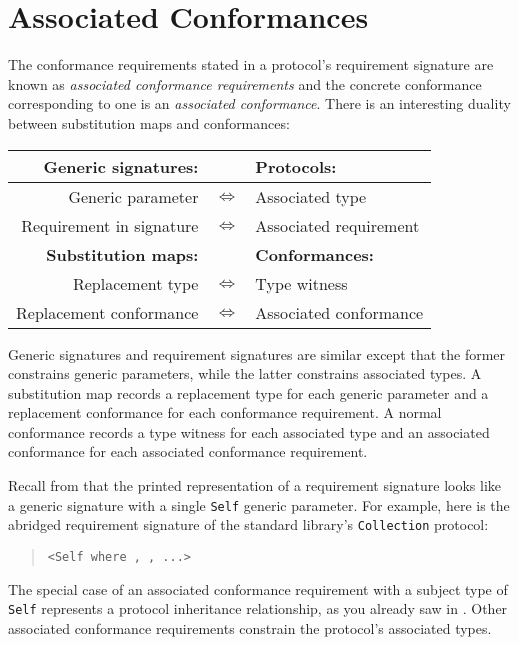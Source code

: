 \documentclass[../generics]{subfiles}
\begin{document}
\section{Associated Conformances}\label{associated conformances}
The conformance requirements stated in a protocol's requirement signature are known as \emph{associated conformance requirements} and the concrete conformance corresponding to one is an \emph{associated conformance}. There is an interesting duality between substitution maps and conformances:
\begin{center}
\begin{tabular}{rcl}
\toprule
\textbf{Generic signatures:}&&\textbf{Protocols:}\\
\midrule
Generic parameter&$\Leftrightarrow$&Associated type\\
Requirement in signature&$\Leftrightarrow$&Associated requirement\\
\midrule
\textbf{Substitution maps:}&&\textbf{Conformances:}\\
\midrule
Replacement type&$\Leftrightarrow$&Type witness\\
Replacement conformance&$\Leftrightarrow$&Associated conformance\\
\bottomrule
\end{tabular}
\end{center}
Generic signatures and requirement signatures are similar except that the former constrains generic parameters, while the latter constrains associated types. A substitution map records a replacement type for each generic parameter and a replacement conformance for each conformance requirement. A normal conformance records a type witness for each associated type and an associated conformance for each associated conformance requirement.

Recall from  that the printed representation of a requirement signature looks like a generic signature with a single \texttt{Self} generic parameter. For example, here is the abridged requirement signature of the standard library's \texttt{Collection} protocol:
\begin{quote}
\texttt{<Self where , , ...>}
\end{quote}
The special case of an associated conformance requirement with a subject type of \texttt{Self} represents a protocol inheritance relationship, as you already saw in . Other associated conformance requirements constrain the protocol's associated types.
\end{document}
